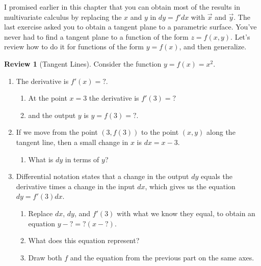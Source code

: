 \documentclass[10pt,]{book}
\theoremstyle{plain}
\theoremstyle{definition}
\theoremstyle{definition}
\theoremstyle{definition}
\newtheorem{project}{Review}[section]
\theoremstyle{definition}
\theoremstyle{definition}
\numberwithin{equation}{section}
\begin{document}
I promised earlier in this chapter that you can obtain most of the results in multivariate calculus by replacing the \(x\) and \(y\) in \(dy=f'dx\) with \(\vec x\) and \(\vec y\). The last exercise asked you to obtain a tangent plane to a parametric surface. You've never had to find a tangent plane to a function of the form \(z=f(x,y)\). Let's review how to do it for functions of the form \(y=f(x)\), and then generalize.%
\begin{project}[Tangent Lines]\label{prob_tangent_line1}
Consider the function \(y=f(x)=x^2\).%
\begin{enumerate}[font=\bfseries,label=(\alph*),ref=\alph*]
\item\label{task-310} The derivative is \(f'(x) = ?\).%
\begin{enumerate}[font=\bfseries,label=(\roman*),ref=\theenumi.\roman*]
\item\label{task-311} At the point \(x=3\) the derivative is \(f'(3)=?\)%
\item\label{task-312} and the output \(y\) is \(y=f(3)=?\).%
\end{enumerate}
\item\label{task-313} If we move from the point \((3,f(3))\) to the point \((x,y)\) along the tangent line, then a small change in \(x\) is \(dx=x-3\).%
\begin{enumerate}[font=\bfseries,label=(\roman*),ref=\theenumi.\roman*]
\item\label{task-314} What is \(dy\) in terms of \(y\)?%
\end{enumerate}
\item\label{task-315} Differential notation states that a change in the output \(dy\) equals the derivative times a change in the input \(dx\), which gives us the equation \(dy=f'(3)dx\).%
\begin{enumerate}[font=\bfseries,label=(\roman*),ref=\theenumi.\roman*]
\item\label{task-316} Replace \(dx\), \(dy\), and \(f'(3)\) with what we know they equal, to obtain an equation \(y-?=?(x-?)\).%
\item\label{task-317} What does this equation represent?%
\item\label{task-318} Draw both \(f\) and the equation from the previous part on the same axes.%
\end{enumerate}
\end{enumerate}
\end{project}
\typeout{************************************************}
\typeout{************************************************}
\end{document}

